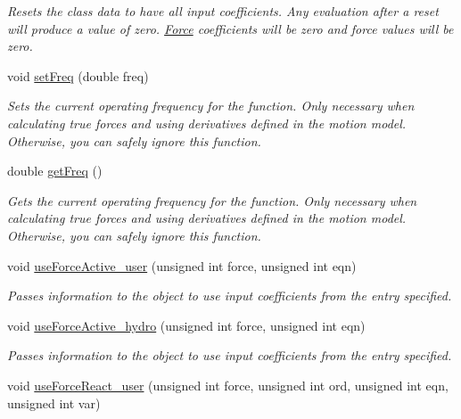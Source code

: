 \begin{DoxyCompactItemize}
\begin{DoxyCompactList}\small\item\em Resets the class data to have all input coefficients. Any evaluation after a reset will produce a value of zero. \hyperlink{classosea_1_1ofreq_1_1_force}{Force} coefficients will be zero and force values will be zero. \end{DoxyCompactList}\item 
void \hyperlink{classosea_1_1ofreq_1_1_motion_model_a18e880b4a0b1a1d1c385bc3be3524440}{set\-Freq} (double freq)
\begin{DoxyCompactList}\small\item\em Sets the current operating frequency for the function. Only necessary when calculating true forces and using derivatives defined in the motion model. Otherwise, you can safely ignore this function. \end{DoxyCompactList}\item 
double \hyperlink{classosea_1_1ofreq_1_1_motion_model_a3461ede3739b468b6bab3a05f94093cc}{get\-Freq} ()
\begin{DoxyCompactList}\small\item\em Gets the current operating frequency for the function. Only necessary when calculating true forces and using derivatives defined in the motion model. Otherwise, you can safely ignore this function. \end{DoxyCompactList}\item 
void \hyperlink{classosea_1_1ofreq_1_1_motion_model_aaf761fac4693612a10771e38993431a0}{use\-Force\-Active\-\_\-user} (unsigned int force, unsigned int eqn)
\begin{DoxyCompactList}\small\item\em Passes information to the object to use input coefficients from the entry specified. \end{DoxyCompactList}\item 
void \hyperlink{classosea_1_1ofreq_1_1_motion_model_a4d3e0590135e1a9f7ce954406f99ff44}{use\-Force\-Active\-\_\-hydro} (unsigned int force, unsigned int eqn)
\begin{DoxyCompactList}\small\item\em Passes information to the object to use input coefficients from the entry specified. \end{DoxyCompactList}\item 
void \hyperlink{classosea_1_1ofreq_1_1_motion_model_a7db1d1ebebe216d17efd7b38f2e9deec}{use\-Force\-React\-\_\-user} (unsigned int force, unsigned int ord, unsigned int eqn, unsigned int var)

\end{DoxyCompactItemize}
